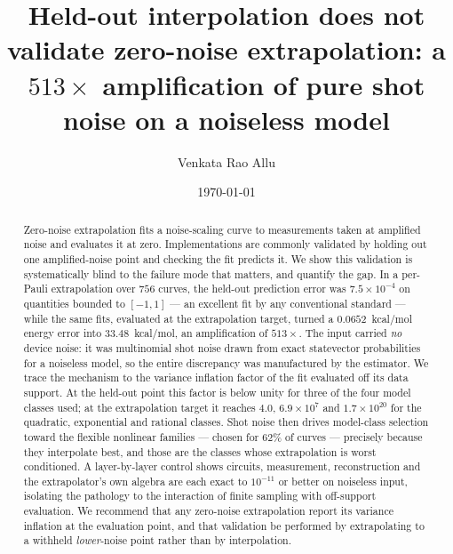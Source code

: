 \documentclass[aps,prx,twocolumn,superscriptaddress,nofootinbib,floatfix]{revtex4-2}
\begin{document}
\title{Held-out interpolation does not validate zero-noise extrapolation:
a $513\times$ amplification of pure shot noise on a noiseless model}

\author{Venkata Rao Allu}

\date{\today}

\begin{abstract}
Zero-noise extrapolation fits a noise-scaling curve to measurements taken
at amplified noise and evaluates it at zero. Implementations are commonly
validated by holding out one amplified-noise point and checking the fit
predicts it. We show this validation is systematically blind to the failure
mode that matters, and quantify the gap. In a per-Pauli extrapolation over
$756$ curves, the held-out prediction error was $7.5\times10^{-4}$ on
quantities bounded to $[-1,1]$ --- an excellent fit by any conventional
standard --- while the same fits, evaluated at the extrapolation target,
turned a $0.0652$~kcal/mol energy error into $33.48$~kcal/mol, an
amplification of $513\times$. The input carried \emph{no} device noise: it
was multinomial shot noise drawn from exact statevector probabilities for a
noiseless model, so the entire discrepancy was manufactured by the
estimator. We trace the mechanism to the variance inflation factor of the
fit evaluated off its data support. At the held-out point this factor is
below unity for three of the four model classes used; at the extrapolation
target it reaches $4.0$, $6.9\times10^{7}$ and $1.7\times10^{20}$ for the
quadratic, exponential and rational classes. Shot noise then drives
model-class selection toward the flexible nonlinear families --- chosen for
$62\%$ of curves --- precisely because they interpolate best, and those are
the classes whose extrapolation is worst conditioned. A layer-by-layer
control shows circuits, measurement, reconstruction and the extrapolator's
own algebra are each exact to $10^{-11}$ or better on noiseless input,
isolating the pathology to the interaction of finite sampling with
off-support evaluation. We recommend that any zero-noise extrapolation
report its variance inflation at the evaluation point, and that validation
be performed by extrapolating to a withheld \emph{lower}-noise point rather
than by interpolation.
\end{abstract}

\maketitle
\end{document}
